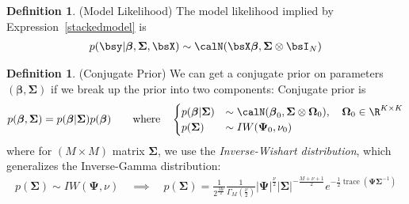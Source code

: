 \documentclass[12pt]{article}
\theoremstyle{plain}
\theoremstyle{definition}
\newtheorem{defn}[thm]{Definition}
\theoremstyle{remark}
\newcommand{\bsSigma}{\boldsymbol{\Sigma}}
\newcommand{\bsbeta}{\boldsymbol{\beta}}
\newcommand{\bsOmega}{\boldsymbol{\Omega}}
\newcommand{\bsPsi}{\boldsymbol{\Psi}}
\newcommand{\trace}{\operatorname{trace}}
\begin{document}
\begin{defn}(Model Likelihood)
The model likelihood implied by Expression~\ref{stackedmodel} is
\begin{align*}
  p(\bsy|\bsbeta,\bsSigma,\bsX)
  \sim
  \calN(\bsX\bsbeta,\bsSigma\otimes \bsI_N)
\end{align*}
\end{defn}

\begin{defn}(Conjugate Prior)
We can get a conjugate prior on parameters $(\bsbeta,\bsSigma)$ if we
break up the prior into two components:
Conjugate prior is
\begin{align*}
  p(\bsbeta,\bsSigma)
  =
  p(\bsbeta|\bsSigma)
  p(\bsbeta)
  \qquad \text{where}\quad
  \begin{cases}
    p(\bsbeta | \bsSigma)
    &\sim \calN(\bsbeta_0,\bsSigma\otimes\bsOmega_0),\quad
    \bsOmega_0\in\R^{K\times K}\\
    p(\bsSigma) &\sim IW(\bsPsi_0,\nu_0) \\
  \end{cases}
\end{align*}
where for $(M\times M)$ matrix $\bsSigma$, we use the
\emph{Inverse-Wishart distribution}, which generalizes the Inverse-Gamma
distribution:
\begin{align*}
  p(\bsSigma) \sim IW(\bsPsi,\nu)
  \quad\implies\quad
  p(\bsSigma)
  =
  \frac{1}{2^{\frac{M\nu}{2}}}
  \frac{1}{\Gamma_M(\frac{\nu}{2})}
  |\bsPsi|^{\frac{\nu}{2}}
  |\bsSigma|^{-\frac{M+\nu+1}{2}}
  e^{-\frac{1}{2}\trace(\bsPsi\bsSigma^{-1})}
\end{align*}
\end{defn}
\end{document}
